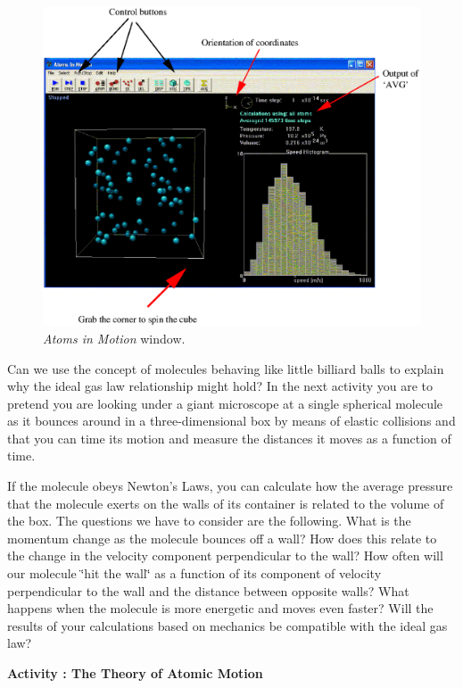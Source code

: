 \begin{figure}[hbt]
\begin{center}
\includegraphics{kineticTheory/am4a.eps}
\caption{{\it Atoms in Motion} window.}
\end{center}
\end{figure}

Can we use the concept of molecules behaving like little billiard
balls to explain why the ideal gas law relationship might hold? In
the next activity you are to pretend you are looking under a giant
microscope at a single spherical molecule as it bounces around in
a three-dimensional box by means of elastic collisions and that you
can time its motion and measure the distances it moves as a function
of time. 

If the molecule obeys Newton's Laws, you can calculate how the average
pressure that the molecule exerts on the walls of its container is
related to the volume of the box. The questions we have to consider
are the following. What is the momentum change as the
molecule bounces off a wall? How does this relate to the change in
the velocity component perpendicular to the wall? How often will our
molecule \char`\"{}hit the wall\char`\"{} as a function of its component
of velocity perpendicular to the wall and the distance between opposite
walls? What happens when the molecule is more energetic and moves
even faster? Will the results of your calculations based on mechanics
be compatible with the ideal gas law?

\textbf{Activity : The Theory of Atomic Motion}

